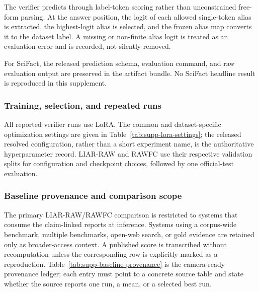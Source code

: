 The verifier predicts through label-token scoring rather than unconstrained
free-form parsing.  At the answer position, the logit of each allowed
single-token alias is extracted, the highest-logit alias is selected, and
the frozen alias map converts it to the dataset label.  A missing or
non-finite alias logit is treated as an evaluation error and is recorded,
not silently removed.

For SciFact, the released prediction schema, evaluation command, and raw
evaluation output are preserved in the artifact bundle.  No SciFact headline
result is reproduced in this supplement.

\subsubsection{Training, selection, and repeated runs}

All reported verifier runs use LoRA.  The common and dataset-specific
optimization settings are given in
Table~\ref{tab:supp-lora-settings}; the released resolved configuration,
rather than a short experiment name, is the authoritative hyperparameter
record.  LIAR-RAW and RAWFC use their respective validation splits for
configuration and checkpoint choices, followed by one official-test
evaluation.


\subsubsection{Baseline provenance and comparison scope}

The primary LIAR-RAW/RAWFC comparison is restricted to systems that consume
the claim-linked reports at inference.  Systems using a corpus-wide
benchmark, multiple benchmarks, open-web search, or gold evidence are
retained only as broader-access context.  A published score is transcribed
without recomputation unless the corresponding row is explicitly marked as
a reproduction.  Table~\ref{tab:supp-baseline-provenance} is the
camera-ready provenance ledger; each entry must point to a concrete source
table and state whether the source reports one run, a mean, or a selected
best run.

